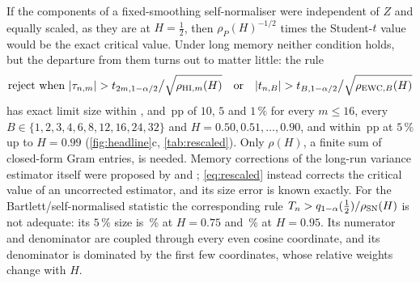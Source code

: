 If the components of a fixed-smoothing self-normaliser were independent of $Z$ and equally scaled, as they are at
$H=\frac12$, then $\rho_P(H)^{-1/2}$ times the Student-$t$ value would be the exact critical value. Under long memory
neither condition holds, but the departure from them turns out to matter little: the rule
\begin{equation}\label{eq:rescaled}
\text{reject when }|\tau_{n,m}|>t_{2m,1-\alpha/2}\big/\sqrt{\rho_{\HI,m}(H)}\quad\text{or}\quad
|t_{n,B}|>t_{B,1-\alpha/2}\big/\sqrt{\rho_{\EWC,B}(H)}
\end{equation}
has exact limit size within ,  and \,pp
of $10$, $5$ and $1\,\%$ for every $m\le16$, every $B\in\{1,2,3,4,6,8,12,16,24,32\}$ and $H=0.50,0.51,\dots,0.90$, and within
\,pp at $5\,\%$ up to $H=0.99$ (\cref{fig:headline}c, \cref{tab:rescaled}). Only $\rho(H)$, a
finite sum of closed-form Gram entries, is needed. Memory corrections of the long-run variance estimator itself were
proposed by \citet{Rob05} and \citet{ADG09}; \eqref{eq:rescaled} instead corrects the critical value of an uncorrected
estimator, and its size error is known exactly. For the Bartlett/self-normalised statistic the corresponding rule
$T_n>q_{1-\alpha}(\frac12)/\rho_{\mathrm{SN}}(H)$ is not adequate: its $5\,\%$ size is \,\% at $H=0.75$
and \,\% at $H=0.95$. Its numerator and denominator are coupled through every even cosine
coordinate, and its denominator is dominated by the first few coordinates, whose relative weights change with $H$.

\begin{table}[tbp]\centering\small
\caption{Largest absolute limiting size error after first-moment rescaling, in percentage points.}\label{tab:rescaled}
%
\end{table}

